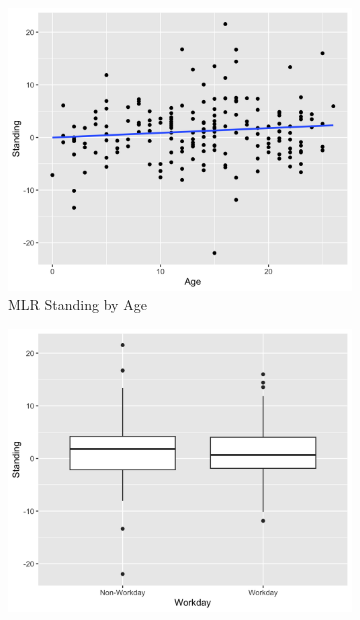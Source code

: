 \documentclass[12pt,twoside,leqno,fleqn,letterpaper]{article}
\theoremstyle{definition}
\theoremstyle{definition}
\begin{document}
            \begin{figure} 
                \centering
                \begin{subfigure}[b]{0.32\textwidth}
                \centering
                \includegraphics[width=\textwidth]{pics/mlr stand by age.png}
                \caption[]%
                {{\small MLR Standing by Age}}
                \label{fig: stand v age}
                \end{subfigure}
                \hfill
                \begin{subfigure}[b]{0.32\textwidth}
                \centering
                \includegraphics[width=\textwidth]{pics/mlr stand by day.png}

\end{subfigure}
\end{figure}
\end{document}
